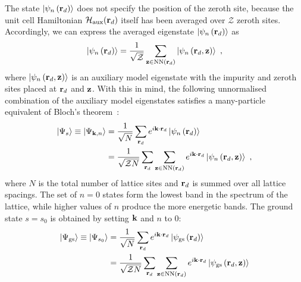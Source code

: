 \documentclass[reprint,hidelinks]{revtex4-2}
\begin{document}
The state \(\ket{\psi_n\left({\bf r}_d\right)}\) does not specify the position of the zeroth site, because the unit cell Hamiltonian \(\mathcal{H}_\text{aux}({\bf r}_d)\) itself has been averaged over \(\mathcal{Z}\) zeroth sites. Accordingly, we can express the averaged eigenstate \(\ket{\psi_n\left({\bf r}_d\right)}\) as
\begin{equation}\begin{aligned}
	\ket{\psi_n\left({\bf r}_d\right)} = \frac{1}{\sqrt\mathcal{Z}}\sum_{{\bf z} \in \text{NN}({\bf r}_d)}\ket{\psi_n\left({\bf r}_d, {\bf z}\right)}~,
\end{aligned}\end{equation}
where \(\ket{\psi_n\left({\bf r}_d, {\bf z}\right)}\) is an auxiliary model eigenstate with the impurity and zeroth sites placed at \({\bf r}_d\) and \({\bf z}\). With this in mind, the following unnormalised combination of the auxiliary model eigenstates satisfies a many-particle equivalent of Bloch's theorem~\cite{stoyanova}:
\begin{equation}\begin{aligned}\label{eigenstateProposal}
	\ket{\Psi_{s}} \equiv \ket{\Psi_{{\bf k}, n}} &= \frac{1}{\sqrt N}\sum_{{\bf r}_d} e^{i {\bf k}\cdot{\bf r}_d} \ket{\psi_{n}\left({\bf r}_d\right)} \\
				&= \frac{1}{\sqrt{\mathcal{Z} N}}\sum_{{\bf r}_d}\sum_{{\bf z} \in \text{NN}({\bf r}_d)} e^{i {\bf k}\cdot{\bf r}_d} \ket{\psi_{n}\left({\bf r}_d, {\bf z}\right)}~,
\end{aligned}\end{equation}
where \(N\) is the total number of lattice sites and \({\bf r}_d\) is summed over all lattice spacings. The set of \(n=0\) states form the lowest band in the spectrum of the lattice, while higher values of \(n\) produce the more energetic bands. The ground state \(s = s_0\) is obtained by setting \({\bf k}\) and \(n\) to 0:
\begin{equation}\begin{aligned}\label{groundstateProposal}
	\ket{\Psi_\text{gs}} \equiv \ket{\Psi_{s_0}} &= \frac{1}{\sqrt N}\sum_{{\bf r}_d} e^{i {\bf k}\cdot{\bf r}_d} \ket{\psi_\text{gs}\left({\bf r}_d\right)} \\
			     &= \frac{1}{\sqrt{\mathcal{Z} N}}\sum_{{\bf r}_d}\sum_{{\bf z} \in \text{NN}({\bf r}_d)} e^{i {\bf k}\cdot{\bf r}_d} \ket{\psi_\text{gs}\left({\bf r}_d, {\bf z}\right)}
\end{aligned}\end{equation}
\end{document}
